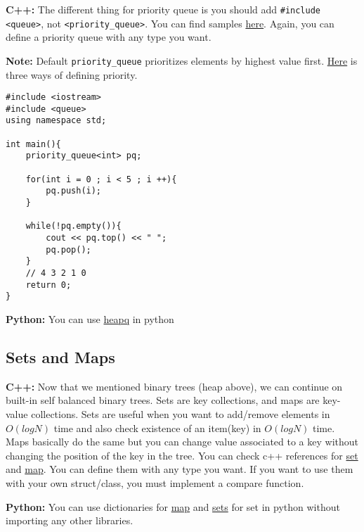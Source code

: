 \documentclass[12pt]{article}
\begin{document}
\textbf{C++: }The different thing for priority queue is you should add \lstinline{#include <queue>}, not \lstinline{<priority_queue>}. You can find samples \href{http://www.cplusplus.com/reference/queue/priority_queue/}{here}. Again, you can define a priority queue with any type you want.

\textbf{Note:} Default \lstinline{priority_queue} prioritizes elements by highest value first. \href{https://en.cppreference.com/w/cpp/container/priority_queue}{Here} is three ways of defining priority.

\begin{verbatim}
#include <iostream>
#include <queue>
using namespace std;

int main(){
    priority_queue<int> pq;

    for(int i = 0 ; i < 5 ; i ++){
        pq.push(i);
    }

    while(!pq.empty()){
        cout << pq.top() << " ";
        pq.pop();
    }
    // 4 3 2 1 0
    return 0;
}

\end{verbatim}

\textbf{Python: } You can use \href{https://docs.python.org/2/library/heapq.html}{heapq} in python

\subsection{Sets and Maps}
\textbf{C++:} Now that we mentioned binary trees (heap above), we can continue on built-in self balanced binary trees. Sets are key collections, and maps are key-value collections. Sets are useful when you want to add/remove elements in $O(logN)$ time and also check existence of an item(key) in $O(logN)$ time. Maps basically do the same but you can change value associated to a key without changing the position of the key in the tree. You can check c++ references for \href{http://www.cplusplus.com/reference/set/set/}{set} and \href{http://www.cplusplus.com/reference/map/map/map/}{map}. You can define them with any type you want. If you want to use them with your own struct/class, you must implement a compare function.

\textbf{Python:} You can use dictionaries for \href{https://docs.python.org/3/tutorial/datastructures.html#dictionaries}{map} and \href{https://docs.python.org/3/tutorial/datastructures.html#sets}{sets} for set in python without importing any other libraries.
\end{document}
